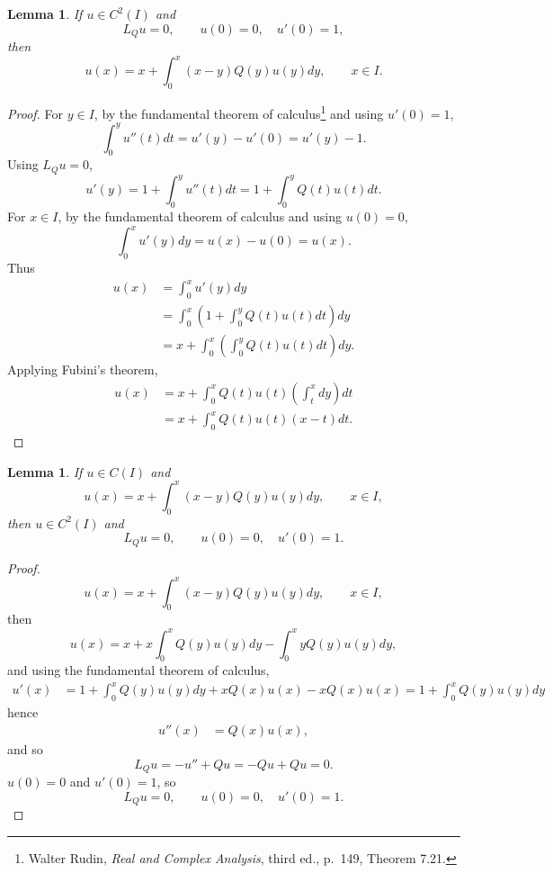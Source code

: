 \documentclass{article}
\newtheorem{lemma}[theorem]{Lemma}
\theoremstyle{definition}
\begin{document}
\begin{lemma}
If $u \in C^2(I)$ and 
\[
L_Q u=0,\qquad u(0)=0, \quad u'(0)=1,
\]
then 
\[
u(x) = x + \int_0^x (x-y)Q(y) u(y)dy,\qquad x \in I.
\]
\end{lemma}
\begin{proof}
For $y \in I$,
by the fundamental theorem of calculus\footnote{Walter Rudin, {\em Real and Complex Analysis}, third ed.,
 p.~149, Theorem 7.21.} and using $u'(0)=1$,
\[
\int_0^y u''(t) dt = u'(y)-u'(0) = u'(y)-1.
\]
Using $L_Qu=0$,
\[
u'(y) = 1 + \int_0^y u''(t) dt = 1 + \int_0^y Q(t) u(t) dt.
\]
For $x \in I$, by the fundamental theorem of calculus and using $u(0)=0$,
\[
\int_0^x u'(y) dy = u(x)-u(0)=u(x).
\]
Thus
\begin{align*}
u(x)&=\int_0^x u'(y) dy\\
&=\int_0^x \left(1 + \int_0^y Q(t) u(t) dt\right) dy\\
&=x + \int_0^x \left( \int_0^y Q(t) u(t) dt\right) dy.
\end{align*}
Applying Fubini's theorem,
\begin{align*}
u(x)&=x + \int_0^x Q(t)u(t) \left( \int_t^x  dy \right) dt\\
&=x + \int_0^x Q(t)u(t) (x-t) dt.
\end{align*}
\end{proof}


\begin{lemma}
If $u \in C(I)$ and 
\[
u(x) = x + \int_0^x (x-y)Q(y)u(y) dy,\qquad x \in I,
\]
then $u \in C^2(I)$ and 
\[
L_Q u=0,\qquad u(0)=0, \quad u'(0)=1.
\]
\label{ulemma}
\end{lemma}
\begin{proof}
\[
u(x) = x + \int_0^x (x-y)Q(y)u(y) dy,\qquad x \in I,
\]
then
\[
 u(x) = x + x \int_0^x Q(y)u(y)dy-\int_0^x yQ(y)u(y)dy,
 \]
 and  using the fundamental theorem of calculus,
\begin{align*}
u'(x) &= 1 + \int_0^x Q(y) u(y) dy + xQ(x)u(x) - xQ(x) u(x)=1+\int_0^x Q(y)u(y) dy
\end{align*}
hence
\begin{align*}
u''(x) &= Q(x)u(x),
\end{align*}
and so
\[
L_Qu=-u''+Qu=-Qu+Qu=0.
\]
$u(0)=0$ and $u'(0)=1$, so
\[
L_Qu=0,\qquad u(0)=0, \quad u'(0)=1.
\]
\end{proof}
\end{document}
